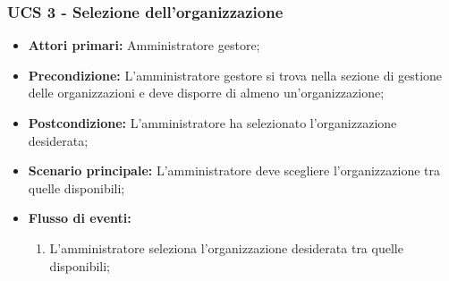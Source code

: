 \subsubsection{UCS 3 - Selezione dell'organizzazione}%
\begin{itemize}
    \item \textbf{Attori primari:} Amministratore gestore;
    \item \textbf{Precondizione:} L’amministratore gestore si trova nella sezione di gestione delle organizzazioni e deve disporre di almeno un'organizzazione;
    \item \textbf{Postcondizione:} L’amministratore ha selezionato l'organizzazione desiderata;
    \item \textbf{Scenario principale:} L'amministratore deve scegliere l'organizzazione tra quelle disponibili;
    \item \textbf{Flusso di eventi:}
    \begin{enumerate}
        \item L'amministratore seleziona l'organizzazione desiderata tra quelle disponibili;
    \end{enumerate}
\end{itemize}